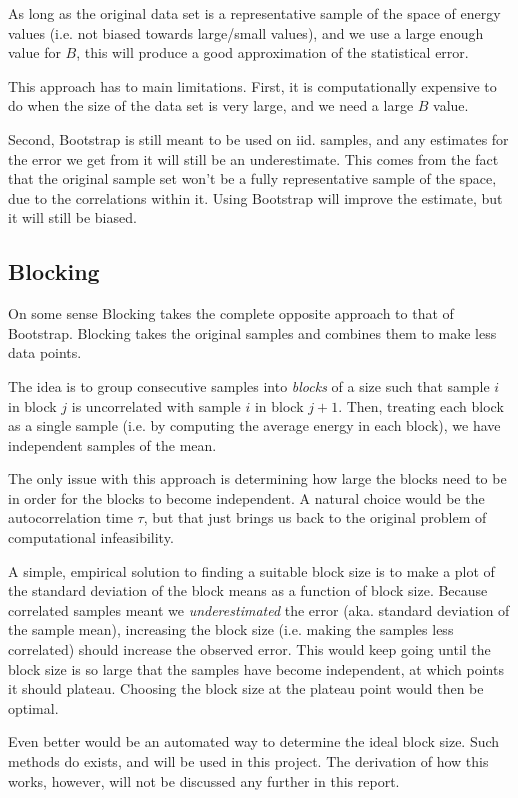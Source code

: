 \documentclass[twocolumn]{article}
\begin{document}
As long as the original data set is a representative sample of the space of
energy values (i.e. not biased towards large/small values), and we use a large
enough value for $B$, this will produce a good approximation of the statistical
error. 

This approach has to main limitations. First, it is computationally
expensive to do when the size of the data set is very large, and we need a large
$B$ value.

Second, Bootstrap is still meant to be used on iid. samples, and any estimates
for the error we get from it will still be an underestimate. This comes from the
fact that the original sample set won't be a fully representative sample of the
space, due to the correlations within it. Using Bootstrap will improve the
estimate, but it will still be biased.


\subsection{Blocking}

On some sense Blocking takes the complete opposite approach to that of
Bootstrap. Blocking takes the original samples and combines them to make less
data points.

The idea is to group consecutive samples into \textit{blocks} of a size such
that sample $i$ in block $j$ is uncorrelated with sample $i$ in block $j+1$.
Then, treating each block as a single sample (i.e. by computing the average
energy in each block), we have independent samples of the mean. 

The only issue with this approach is determining how large the blocks need to be
in order for the blocks to become independent. A natural choice would be the
autocorrelation time $\tau$, but that just brings us back to the original
problem of computational infeasibility.

A simple, empirical solution to finding a suitable block size is to make a plot
of the standard deviation of the block means as a function of block
size. Because correlated samples meant we \textit{underestimated} the error (aka.
standard deviation of the sample mean), increasing the block size (i.e. making the
samples less correlated) should increase the observed error. This would keep
going until the block size is so large that the samples have become independent,
at which points it should plateau. Choosing the block size at the plateau point
would then be optimal.

Even better would be an automated way to determine the ideal block size. Such
methods do exists, and will be used in this project. The derivation of how this
works, however, will not be discussed any further in this report.
\end{document}
